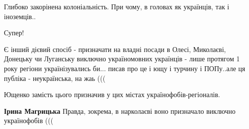 \begin{itemize}
\begin{itemize}
 
Глибоко закорінена колоніальність. При чому, в головах як українців, так і іноземців..
\end{itemize}

 
Супер!

 

Є інший дієвий спосіб - призначати на владні посади в Олесі, Миколаєві,
Донецьку чи Луганську виключно україномовних українців - лише протягом 1 року
регіони українізувались би... писав про це і ющу і турчину і ПОПу..але ця
публіка - неукраїнська, на жаь (((

\begin{itemize}
 
Ющенко замість цього призначив у цих містах українофобів-регіоналів.

 
\textbf{Ірина Магрицька} Правда, зокрема, в нарколаєві воно призначало виключно українофобів (((

 

\end{itemize}
\end{itemize}
